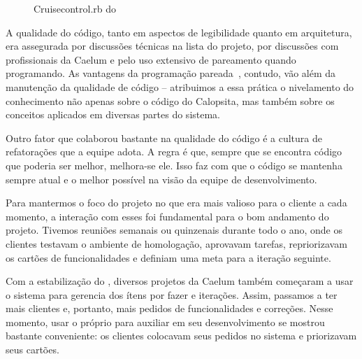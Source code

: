 \begin{figure}[H]
  \centering
  \caption{Cruisecontrol.rb do \calopsita}
\end{figure}

A qualidade do código, tanto em aspectos de legibilidade quanto em arquitetura, era assegurada por discussões técnicas na lista do projeto, por discussões com profissionais da Caelum e pelo uso extensivo de pareamento quando programando. As vantagens da programação pareada~\cite{pair}, contudo, vão além da manutenção da qualidade de código -- atribuimos a essa prática o nivelamento do conhecimento não apenas sobre o código do Calopsita, mas também sobre os conceitos aplicados em diversas partes do sistema.

Outro fator que colaborou bastante na qualidade do código é a cultura de refatorações que a equipe adota. A regra é que, sempre que se encontra código que poderia ser melhor, melhora-se ele. Isso faz com que o código se mantenha sempre atual e o melhor possível na visão da equipe de desenvolvimento.

Para mantermos o foco do projeto no que era mais valioso para o cliente a cada momento, a interação com esses foi fundamental para o bom andamento do projeto. Tivemos reuniões semanais ou quinzenais durante todo o ano, onde os clientes testavam o \calopsita ambiente de homologação, aprovavam tarefas,  repriorizavam os cartões de funcionalidades e definiam uma meta para a iteração seguinte. 

Com a estabilização do \calopsita, diversos projetos da Caelum também começaram a usar o sistema para gerencia dos ítens por fazer e iterações. Assim, passamos a ter mais clientes e, portanto, mais pedidos de funcionalidades e correções. Nesse momento, usar o próprio \calopsita para auxiliar em seu desenvolvimento se mostrou bastante conveniente: os clientes colocavam seus pedidos no sistema e priorizavam seus cartões.

